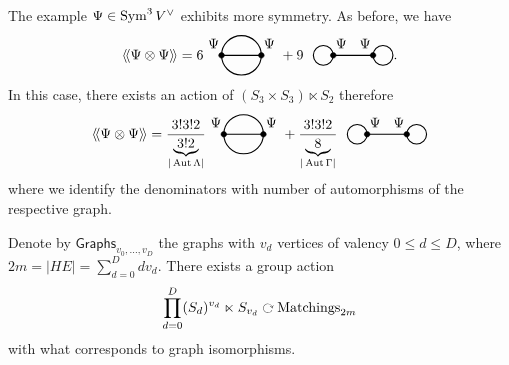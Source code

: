 \begin{example}
  The example $\Psi \in \operatorname{Sym}^3 V^\vee$ exhibits more symmetry. As before, we have
  \begin{equation*}
    \avg{\Psi \otimes \Psi}
    = 6
    \begin{tikzpicture}[baseline=-1mm]
      \draw[thick] (0, 0) node at (-0.2, 0.3) {$\Psi$} -- (1, 0) node at (1.2, 0.3) {$\Psi$};
      \draw[thick] (0, 0) arc (180:0:.5);
      \draw[thick] (0, 0) arc (-180:0:.5);
      \draw[fill=black] (0, 0) circle (2pt);
      \draw[fill=black] (1, 0) circle (2pt);
    \end{tikzpicture}
    + 9 \ \
    \begin{tikzpicture}[baseline=-1mm]
      \draw[thick] (0, 0) node at (0.2, 0.3) {$\Psi$} -- (1, 0) node at (0.8, .3) {$\Psi$};
      \draw[thick] (-.25, 0) circle (2.5mm);
      \draw[thick] (1.25, 0) circle (2.5mm);
      \draw[fill=black] (0, 0) circle (2pt);
      \draw[fill=black] (1, 0) circle (2pt);
    \end{tikzpicture}.
  \end{equation*}
  In this case, there exists an action of $(S_3 \times S_3) \ltimes S_2$ therefore
  \begin{equation*}
    \avg{\Psi \otimes \Psi}
    = \frac{3! 3! 2}{\underbrace{3! 2}_{| \Aut \Lambda |}}
    \begin{tikzpicture}[baseline=-1mm]
      \draw[thick] (0, 0) node at (-0.2, 0.3) {$\Psi$} -- (1, 0) node at (1.2, 0.3) {$\Psi$};
      \draw[thick] (0, 0) arc (180:0:.5);
      \draw[thick] (0, 0) arc (-180:0:.5);
      \draw[fill=black] (0, 0) circle (2pt);
      \draw[fill=black] (1, 0) circle (2pt);
    \end{tikzpicture}
    + \frac{3! 3! 2}{\underbrace{8}_{|\Aut \Gamma|}} \ \
    \begin{tikzpicture}[baseline=-1mm]
      \draw[thick] (0, 0) node at (0.2, 0.3) {$\Psi$} -- (1, 0) node at (0.8, .3) {$\Psi$};
      \draw[thick] (-.25, 0) circle (2.5mm);
      \draw[thick] (1.25, 0) circle (2.5mm);
      \draw[fill=black] (0, 0) circle (2pt);
      \draw[fill=black] (1, 0) circle (2pt);
    \end{tikzpicture}
  \end{equation*}
  where we identify the denominators with number of automorphisms of the respective graph.
\end{example}

Denote by $\mathsf{Graphs}_{v_0, \dots, v_D}$ the graphs with $v_d$ vertices of valency $0 \leq d \leq D$, where $2m = |HE| = \sum_{d = 0}^D d {v_d}$. There exists a group action
\begin{equation*}
  \prod_{d = 0}^D (S_d)^{v_d} \ltimes S_{v_d} \acts \text{Matchings}_{2m}
\end{equation*}
with what corresponds to graph isomorphisms.
